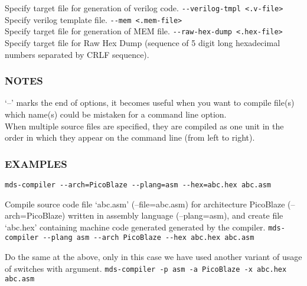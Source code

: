            Specify target file for generation of verilog code.
            {
                \usecodefont
                \verb'--verilog-tmpl <.v-file>'\\
            }
            Specify verilog template file.
            {
                \usecodefont
                \verb'--mem <.mem-file>'\\
            }
            Specify target file for generation of MEM file.
            {
                \usecodefont
                \verb'--raw-hex-dump <.hex-file>'\\
            }
            Specify target file for Raw Hex Dump (sequence of 5 digit long hexadecimal numbers separated by CRLF sequence).\\

        \subsubsection{NOTES}
            `--' marks the end of options, it becomes useful when you want to compile file(s) which name(s) could be mistaken for a command line option.\\

            When multiple source files are specified, they are compiled as one unit in the order in which they appear on the command line (from left to right).

        \subsubsection{EXAMPLES}
            {
                \usecodefont
                \verb'mds-compiler --arch=PicoBlaze --plang=asm --hex=abc.hex abc.asm'\\
            }

            Compile source code file `abc.asm' (--file=abc.asm) for architecture PicoBlaze (--arch=PicoBlaze) written in assembly language (--plang=asm), and create file `abc.hex' containing machine code generated generated by the compiler.
            {
                \usecodefont
                \verb'mds-compiler --plang asm --arch PicoBlaze --hex abc.hex abc.asm'\\
            }

            Do the same at the above, only in this case we have used another variant of usage of switches with argument.
            {
                \usecodefont
                \verb'mds-compiler -p asm -a PicoBlaze -x abc.hex abc.asm'\\
            }


